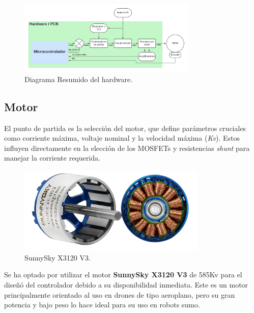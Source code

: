 \documentclass[11pt]{report}
\begin{document}
\begin{figure}[ht]
	\centering
	\includegraphics[width=0.76\textwidth]{imagenes/Diagramas/Diagramas - resumen hardware.png}
	\caption{Diagrama Resumido del hardware.}
	\label{flujo_resumen_hardware}
\end{figure}
\FloatBarrier

\subsection{Motor}

El punto de partida es la selección del motor, que define parámetros cruciales como corriente máxima, voltaje nominal y la velocidad máxima (\emph{Kv}). Estos influyen directamente en la elección de los MOSFETs y resistencias \emph{shunt} para manejar la corriente requerida.

\begin{figure}[ht]
	\centering
	\includegraphics[width=0.8\textwidth]{imagenes/Motor/X3120.png}
	\caption{SunnySky X3120 V3.}
	\label{X3120}
\end{figure}
\FloatBarrier
\newpage
Se ha optado por utilizar el motor \textbf{SunnySky X3120 V3} de 585Kv para el diseñó del controlador debido a su disponibilidad inmediata. Este es un motor principalmente orientado al uso en drones de tipo aeroplano, pero su gran potencia y bajo peso lo hace ideal para su uso en robots sumo.
\end{document}
